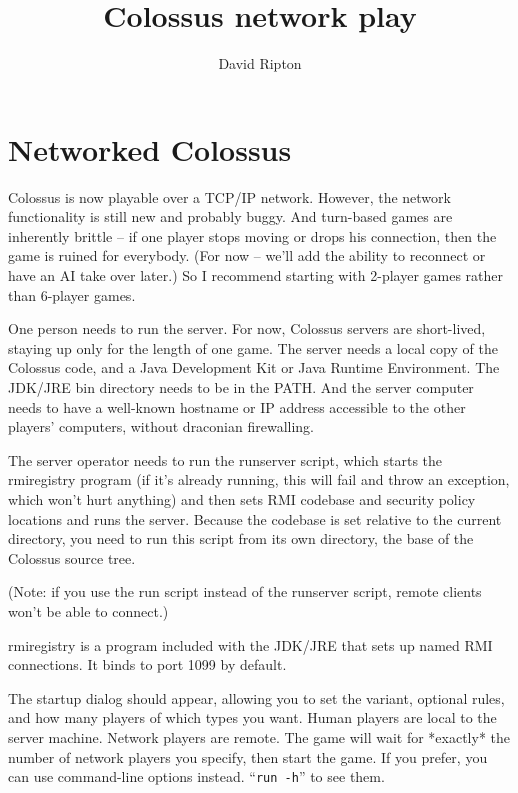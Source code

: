\documentclass{article}
\begin{document}

\title{Colossus network play}

\author{David Ripton}

\maketitle

\section{Networked Colossus}

Colossus is now playable over a TCP/IP network.  However, the network 
functionality is still new and probably buggy.  And turn-based games
are inherently brittle -- if one player stops moving or drops his 
connection, then the game is ruined for everybody.  (For now -- we'll
add the ability to reconnect or have an AI take over later.)  So I
recommend starting with 2-player games rather than 6-player games.

One person needs to run the server.  For now, Colossus servers are 
short-lived, staying up only for the length of one game.  The server
needs a local copy of the Colossus code, and a Java Development Kit 
or Java Runtime Environment.  The JDK/JRE bin directory needs to be 
in the PATH.  And the server computer needs to have a well-known 
hostname or IP address accessible to the other players' computers, 
without draconian firewalling.

The server operator needs to run the runserver script, which starts
the rmiregistry program (if it's already running, this will fail and 
throw an exception, which won't hurt anything) and then sets RMI 
codebase and security policy locations and runs the server.  Because
the codebase is set relative to the current directory, you need to run
this script from its own directory, the base of the Colossus source tree.

(Note: if you use the run script instead of the runserver script,
remote clients won't be able to connect.)

rmiregistry is a program included with the JDK/JRE that sets up named 
RMI connections.  It binds to port 1099 by default.

The startup dialog should appear, allowing you to set the variant,
optional rules, and how many players of which types you want.  Human
players are local to the server machine.  Network players are remote.
The game will wait for *exactly* the number of network players you 
specify, then start the game.  If you prefer, you can use command-line 
options instead.  ``\texttt{run -h}'' to see them.
\end{document}

